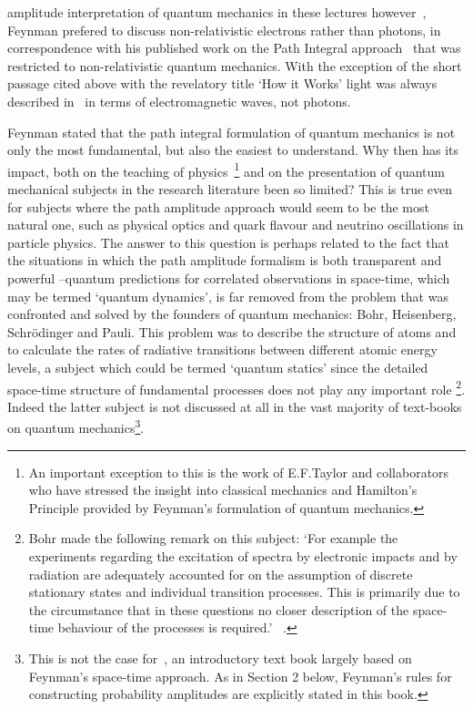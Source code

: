  amplitude interpretation of quantum mechanics in these lectures however~\cite{Feyn4}, Feynman
 prefered to discuss non-relativistic electrons rather than photons, in correspondence with
 his published work on the Path Integral approach~\cite{Feyn5,Feyn6} that was restricted
 to non-relativistic quantum mechanics. With the exception of the short passage cited
 above with the revelatory title `How it Works' light was always described in~\cite{Feyn2} 
 in terms of electromagnetic waves, not photons. 
 \par Feynman stated that the path integral formulation of quantum mechanics is not
 only the most fundamental, but also the easiest to understand. Why then has its impact,
 both on the teaching of physics~\footnote{An important exception to this is the work of 
   E.F.Taylor and collaborators~\cite{EFT} who have stressed the insight into classical
   mechanics and Hamilton's Principle provided by Feynman's formulation of quantum mechanics.}
   and on the presentation of quantum mechanical subjects in the research literature
  been so limited? This is true even for subjects where the path amplitude approach 
  would seem to be the most natural one, such as physical optics and quark flavour and
   neutrino oscillations in particle physics. The answer to this question is perhaps
  related to the fact that the situations in which the path amplitude formalism
  is both transparent and powerful --quantum predictions for correlated observations
  in space-time, which may be termed `quantum dynamics', is far removed from the problem
   that was confronted and solved by the founders of quantum mechanics: Bohr, Heisenberg,
   Schr\"{o}dinger and Pauli. This problem was to describe the structure of atoms and to
   calculate the rates of radiative transitions between different atomic energy levels,
   a subject which could be termed `quantum statics' since the detailed space-time
   structure of fundamental processes does not play any important role
    \footnote{Bohr made the following remark on this subject:
     `For example the experiments regarding the excitation of spectra 
    by electronic impacts and by radiation are adequately accounted for on the 
   assumption of discrete stationary states and individual transition
   processes. This is primarily due to the circumstance that in these questions
   no closer description of the space-time behaviour of the processes is required.'
   ~\cite{BohrCI}.}. Indeed the latter
   subject is not discussed at all in the vast majority of text-books on 
  quantum mechanics\footnote{ This is not the case for~\cite{LLFB}, an introductory
  text book largely based on Feynman's space-time approach. As in Section 2 below,
   Feynman's rules for constructing probability amplitudes are explicitly stated
   in this book.}.
